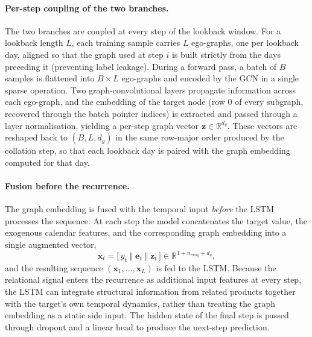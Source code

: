 \paragraph{Per-step coupling of the two branches.}
The two branches are coupled at every step of the lookback window. For a
lookback length $L$, each training sample carries $L$ ego-graphs, one per
lookback day, aligned so that the graph used at step $i$ is built strictly from
the days preceding it (preventing label leakage). During a forward pass, a
batch of $B$ samples is flattened into $B \times L$ ego-graphs and encoded by
the GCN in a single sparse operation. Two graph-convolutional layers propagate
information across each ego-graph, and the embedding of the target node (row $0$
of every subgraph, recovered through the batch pointer indices) is extracted
and passed through a layer normalisation, yielding a per-step graph vector
$\mathbf{z} \in \mathbb{R}^{d_g}$. These vectors are reshaped back to
$(B, L, d_g)$ in the same row-major order produced by the collation step, so
that each lookback day is paired with the graph embedding computed for that day.

\paragraph{Fusion before the recurrence.}
The graph embedding is fused with the temporal input \emph{before} the LSTM
processes the sequence. At each step the model concatenates the target value,
the exogenous calendar features, and the corresponding graph embedding into a
single augmented vector,
\[
\mathbf{x}_t = \big[\, y_t \;\Vert\; \mathbf{e}_t \;\Vert\; \mathbf{z}_t \,\big]
\in \mathbb{R}^{1 + n_\text{exog} + d_g},
\]
and the resulting sequence $(\mathbf{x}_1, \dots, \mathbf{x}_L)$ is fed to the
LSTM. Because the relational signal enters the recurrence as additional
input features at every step, the LSTM can integrate structural information
from related products together with the target's own temporal dynamics, rather
than treating the graph embedding as a static side input. The hidden state of
the final step is passed through dropout and a linear head to produce the
next-step prediction.

